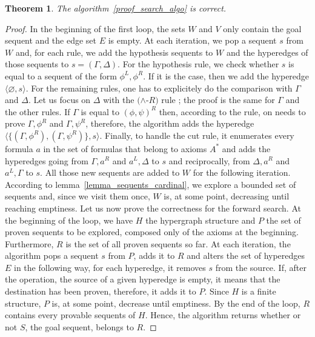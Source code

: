 \documentclass[a4paper, 11pt]{article}
\newtheorem{theorem}{Theorem}
\begin{document}
    \begin{theorem}
	    The algorithm~\ref{proof_search_algo} is correct.
    \end{theorem}
    \begin{proof}
	In the beginning of the first loop, the sets $W$ and $V$ only contain the goal sequent and the
	    edge set $E$ is empty. At each iteration, we pop a sequent $s$ from $W$ and, for each rule,
	    we add the hypothesis sequents to $W$ and the hyperedges of those sequents to 
	    $s=(\Gamma,\Delta)$. For the 
	    hypothesis rule, we check whether $s$ is equal to a sequent of the form $\phi^L,\phi^R$.
	    If it is the case, then we add the hyperedge $\langle\varnothing,s\rangle$. For the
	    remaining rules, one has to explicitely do the comparison with $\Gamma$ and $\Delta$. Let us
	    focus on $\Delta$ with the $(\wedge$-$R)$ rule ; the proof is the same for $\Gamma$ and the
	    other rules. If $\Gamma$ is equal to $(\phi,\psi)^R$ then, according to the rule, on needs
	    to prove $\Gamma,\phi^R$ and $\Gamma,\psi^R$, therefore, the algorithm adds the hyperedge
	    $\langle\{(\Gamma,\phi^R),(\Gamma,\psi^R)\},s\rangle$. Finally, to handle the cut rule,
	    it enumerates every formula $a$ in the set of formulas that belong to axioms $A^*$ and
	    adds the hyperedges going from $\Gamma,a^R$ and $a^L,\Delta$ to $s$ and reciprocally, from
	    $\Delta,a^R$ and $a^L,\Gamma$ to $s$. All those new sequents are added to $W$ for the
	    following iteration. According to lemma~\ref{lemma_sequents_cardinal}, we explore a bounded
	    set of sequents and, since we visit them once, $W$ is, at some point, decreasing until
	    reaching emptiness.
	    Let us now prove the correctness for the forward search. At the beginning of the loop, we
	    have $H$ the hypergraph structure and $P$ the set of proven
	    sequents to be explored, composed only of the axioms at the beginning. Furthermore, $R$ is
	    the set of all proven sequents so far. At each iteration, the algorithm pops a sequent
	    $s$ from $P$, adds it to $R$ and alters the set of hyperedges $E$ in the following way,
	    for each hyperedge, it removes $s$ from the source. If, after the operation, the source
	    of a given hyperedge is empty, it means that the destination has been proven, therefore, it
	    adds it to $P$. Since $H$ is a finite structure, $P$ is, at some point, decrease until 
	    emptiness. By the end of the loop, $R$ contains every provable sequents of $H$. Hence, the
	    algorithm returns whether or not $S$, the goal sequent, belongs to $R$.
    \end{proof}
\end{document}
